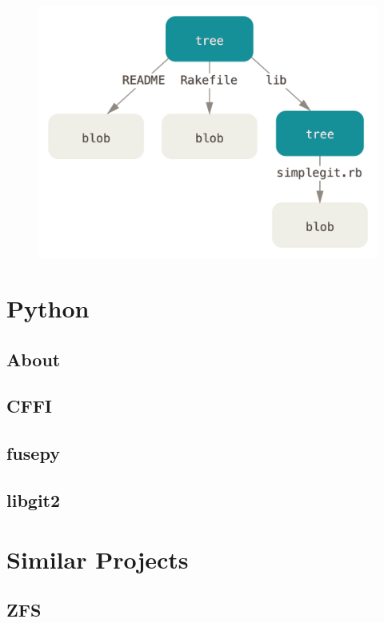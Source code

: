         \begin{figure}[h]
           \begin{center}
               \includegraphics[width=15cm]{technology/data-model-1.png}
            \end{center}
        \end{figure}
    
\section{Python}
    \subsection{About}
    \subsection{CFFI}
    \subsection{fusepy}
    \subsection{libgit2}
    
\section{Similar Projects}
    \subsection{ZFS}